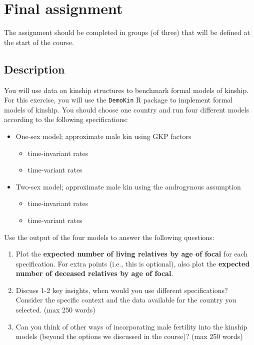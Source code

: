 ﻿\documentclass{article}
\begin{document}
\section{Final assignment}
\label{sec:assignment}

The assignment should be completed in groups (of three) that will be defined at the start of the course.

\subsection{Description}

You will use data on kinship structures to benchmark formal models of kinship.
For this exercise, you will use the \texttt{DemoKin} R package to implement formal models of kinship. 
You should choose one country and run four different models according to the following specifications:

    \begin{itemize}
        \item One-sex model; approximate male kin using GKP factors
       \begin{itemize}
           \item time-invariant rates
           \item time-variant rates
       \end{itemize}  
        
        \item Two-sex model; approximate male kin using the androgynous assumption
         \begin{itemize}
           \item time-invariant rates
           \item time-variant rates
             \end{itemize}  
     \end{itemize}

    Use the output of the four models to answer the following questions:

    \begin{enumerate}
     
    \item Plot the \textbf{expected number of living relatives by age of focal} for each specification. For extra points (i.e., this is optional), also plot the \textbf{expected number of deceased relatives by age of focal}.
    \item Discuss 1-2 key insights, when would you use different specifications? Consider the specific context and the data available for the country you selected. (max 250 words)
    \item Can you think of other ways of incorporating male fertility into the kinship models (beyond the options we discussed in the course)?  (max 250 words)
       \end{enumerate}  
\end{document}

